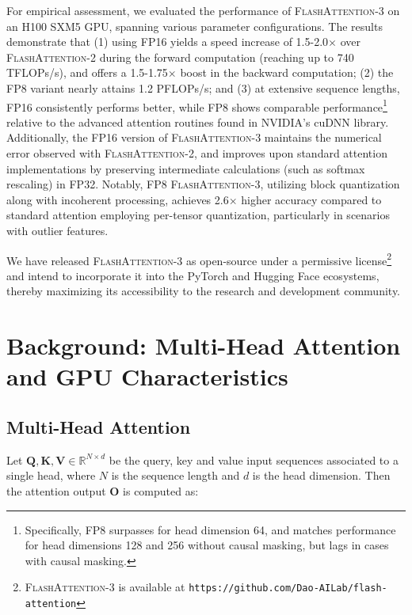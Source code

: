 For empirical assessment, we evaluated the performance of \textsc{FlashAttention-3} on an H100 SXM5 GPU, spanning various parameter configurations. The results demonstrate that (1) using FP16 yields a speed increase of 1.5-2.0$\times$ over \textsc{FlashAttention-2} during the forward computation (reaching up to 740 TFLOPs/s), and offers a 1.5-1.75$\times$ boost in the backward computation; (2) the FP8 variant nearly attains 1.2 PFLOPs/s; and (3) at extensive sequence lengths, FP16 consistently performs better, while FP8 shows comparable performance\footnote{Specifically, FP8 surpasses for head dimension 64, and matches performance for head dimensions 128 and 256 without causal masking, but lags in cases with causal masking.} relative to the advanced attention routines found in NVIDIA’s cuDNN library. Additionally, the FP16 version of \textsc{FlashAttention-3} maintains the numerical error observed with \textsc{FlashAttention-2}, and improves upon standard attention implementations by preserving intermediate calculations (such as softmax rescaling) in FP32. Notably, FP8 \textsc{FlashAttention-3}, utilizing block quantization along with incoherent processing, achieves 2.6$\times$ higher accuracy compared to standard attention employing per-tensor quantization, particularly in scenarios with outlier features.

We have released \textsc{FlashAttention-3} as open-source under a permissive license\footnote{\textsc{FlashAttention-3} is available at \texttt{https://github.com/Dao-AILab/flash-attention}} and intend to incorporate it into the PyTorch and Hugging Face ecosystems, thereby maximizing its accessibility to the research and development community.

\section{Background: Multi-Head Attention and GPU Characteristics}
\label{sec:background}

\subsection{Multi-Head Attention}
\label{subsec:multi_head_attn}

Let $\mathbf{Q}, \mathbf{K}, \mathbf{V} \in \mathbb{R}^{N \times d}$ be the query, key and value input sequences associated to a single head, where $N$ is the sequence length and $d$ is the head dimension. Then the attention output $\mathbf{O}$ is computed as:

